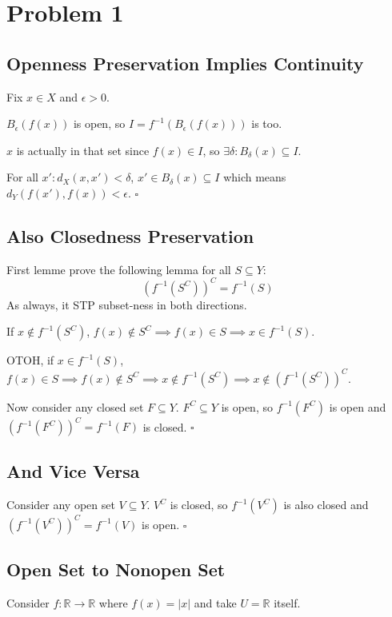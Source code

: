 \documentclass[12pt]{article}
\newcommand{\R}{\mathbb{R}}
\begin{document}
\section{Problem 1}

\subsection{Openness Preservation Implies Continuity}

Fix $x \in X$ and $\epsilon > 0$.

$B_\epsilon(f(x))$ is open, so $I=f^{-1}(B_\epsilon(f(x)))$ is too.

$x$ is actually in that set since $f(x) \in I$, so $\exists \delta: B_\delta(x) \subseteq I$.

For all $x': d_X(x, x') < \delta$, $x' \in B_\delta(x) \subseteq I$
which means $d_Y(f(x'), f(x)) < \epsilon$. $\square$

\subsection{Also Closedness Preservation}

First lemme prove the following lemma for all $S \subseteq Y$:
\[\left(f^{-1}(S^C)\right)^C = f^{-1}(S)\]
As always, it STP subset-ness in both directions.

If $x \notin f^{-1}(S^C)$, $f(x) \notin S^C \implies f(x) \in S \implies x \in f^{-1}(S)$.

OTOH, if $x \in f^{-1}(S)$, $f(x) \in S \implies f(x) \notin S^C \implies x \notin f^{-1}(S^C) \implies x \notin \left(f^{-1}(S^C)\right)^C$.

Now consider any closed set $F \subseteq Y$.
$F^C \subseteq Y$ is open, so $f^{-1}(F^C)$ is open
and $\left(f^{-1}(F^C)\right)^C = f^{-1}(F)$ is closed. $\square$

\subsection{And Vice Versa}

Consider any open set $V \subseteq Y$.
$V^C$ is closed, so $f^{-1}\left(V^C\right)$ is also closed
and $\left(f^{-1}\left(V^C\right)\right)^C = f^{-1}(V)$ is open. $\square$

\subsection{Open Set to Nonopen Set}

Consider $f: \R \to \R$ where $f(x) = |x|$ and take $U = \R$ itself.
\end{document}
